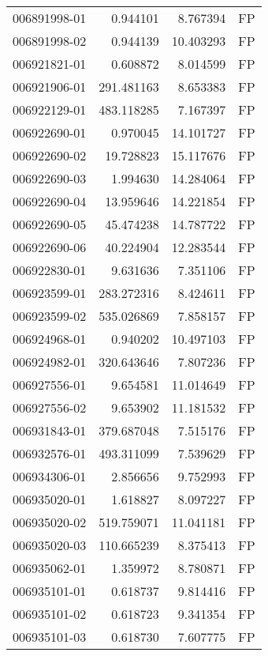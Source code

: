 \begin{tabular}{lrrl}
006891998-01 &    0.944101 &       8.767394 &   FP \\
006891998-02 &    0.944139 &      10.403293 &   FP \\
006921821-01 &    0.608872 &       8.014599 &   FP \\
006921906-01 &  291.481163 &       8.653383 &   FP \\
006922129-01 &  483.118285 &       7.167397 &   FP \\
006922690-01 &    0.970045 &      14.101727 &   FP \\
006922690-02 &   19.728823 &      15.117676 &   FP \\
006922690-03 &    1.994630 &      14.284064 &   FP \\
006922690-04 &   13.959646 &      14.221854 &   FP \\
006922690-05 &   45.474238 &      14.787722 &   FP \\
006922690-06 &   40.224904 &      12.283544 &   FP \\
006922830-01 &    9.631636 &       7.351106 &   FP \\
006923599-01 &  283.272316 &       8.424611 &   FP \\
006923599-02 &  535.026869 &       7.858157 &   FP \\
006924968-01 &    0.940202 &      10.497103 &   FP \\
006924982-01 &  320.643646 &       7.807236 &   FP \\
006927556-01 &    9.654581 &      11.014649 &   FP \\
006927556-02 &    9.653902 &      11.181532 &   FP \\
006931843-01 &  379.687048 &       7.515176 &   FP \\
006932576-01 &  493.311099 &       7.539629 &   FP \\
006934306-01 &    2.856656 &       9.752993 &   FP \\
006935020-01 &    1.618827 &       8.097227 &   FP \\
006935020-02 &  519.759071 &      11.041181 &   FP \\
006935020-03 &  110.665239 &       8.375413 &   FP \\
006935062-01 &    1.359972 &       8.780871 &   FP \\
006935101-01 &    0.618737 &       9.814416 &   FP \\
006935101-02 &    0.618723 &       9.341354 &   FP \\
006935101-03 &    0.618730 &       7.607775 &   FP \\

\end{tabular}
